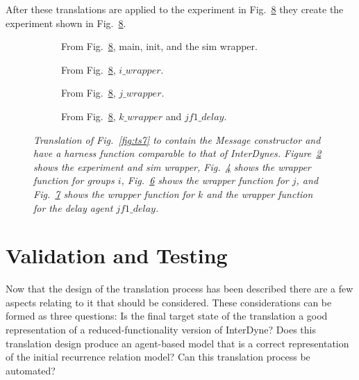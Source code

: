 \documentclass{article}
\begin{document}
After these translations are applied to the experiment in Fig.~\ref{fig:ts8} they create the experiment shown in Fig.~\ref{fig:ts8}.
\begin{figure}[H]
	\centering
	\begin{subfigure}[b]{1\textwidth}
	
	\caption{From Fig.~\ref{fig:ts8}, main, init, and the sim wrapper.  }
        \label{fig:ts81}
	\end{subfigure}
	\caption*{}
\end{figure}
	
\begin{figure}[H]\ContinuedFloat
	\centering
	\begin{subfigure}[b]{1\textwidth}
	
	\caption{From Fig.~\ref{fig:ts8}, $i\_wrapper$.  }
        \label{fig:ts82}
	\end{subfigure}
	\caption*{}
\end{figure}

\begin{figure}[H]\ContinuedFloat
	\centering
	\begin{subfigure}[b]{1\textwidth}
	
	\caption{From Fig.~\ref{fig:ts8}, $j\_wrapper$.  }
        \label{fig:ts83}
	\end{subfigure}
	\caption*{}
\end{figure}
	
\begin{figure}[H]\ContinuedFloat
	\centering
	\begin{subfigure}[b]{1\textwidth}
	
	\caption{From Fig.~\ref{fig:ts8}, $k\_wrapper$ and $jf1\_delay$.  }
        \label{fig:ts84}
	\end{subfigure}
	\caption{\it Translation of Fig.~\ref{fig:ts7} to contain the Message constructor and have a harness function comparable to that of InterDynes. Figure~\ref{fig:ts81} shows the experiment and sim wrapper, Fig.~\ref{fig:ts82} shows the wrapper function for groups $i$, Fig.~\ref{fig:ts83} shows the wrapper function for $j$, and Fig.~\ref{fig:ts84} shows the wrapper function for $k$ and the wrapper function for the delay agent $jf1\_delay$.}
	\label{fig:ts8}
\end{figure} 


\newpage
\section{Validation and Testing}
Now that the design of the translation process has been described there are a few aspects relating to it that should be considered. These considerations can be formed as three questions: Is the final target state of the translation a good representation of a reduced-functionality version of InterDyne? Does this translation design produce an agent-based model that is a correct representation of the initial recurrence relation model? Can this translation process be automated?   
\end{document}
